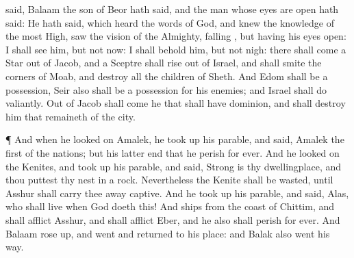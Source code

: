 {said,
Balaam the
son of
Beor hath
said, and the
man whose
eyes are
open hath
said:
He hath
said, which
heard the
words of
God, and
knew the
knowledge of the most
High,
{}
saw the
vision of the
Almighty,
falling
{}, but having his
eyes
open:
I shall
see him, but not now: I shall
behold him, but not
nigh: there shall
come a
Star out of
Jacob, and a
Sceptre shall
rise out of
Israel, and shall
smite the
corners of
Moab, and
destroy all the
children of
Sheth.
And
Edom shall be a
possession,
Seir also shall be a
possession for his
enemies; and
Israel shall
do
valiantly.
Out of
Jacob shall come he that shall have
dominion, and shall
destroy him that
remaineth of the
city.
\par }{\PP {}¶ And when he
looked on
Amalek, he took
up his
parable, and
said,
Amalek
{} the
first of the
nations; but his
latter end
{} that he
perish for
ever.
And he
looked on the
Kenites, and took
up his
parable, and
said,
Strong is thy
dwellingplace, and thou
puttest thy
nest in a
rock.
Nevertheless the
Kenite
shall be
wasted, until
Asshur shall carry thee away
captive.
And he took
up his
parable, and
said,
Alas, who shall
live when
God
doeth this!
And
ships
{} from the
coast of
Chittim, and shall
afflict
Asshur, and shall
afflict
Eber, and he also shall
perish for
ever.
And
Balaam rose
up, and
went and
returned to his
place: and
Balak also
went his
way.

}
